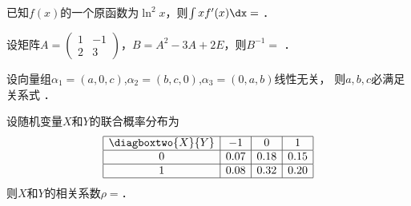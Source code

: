 \documentclass[plain,noanswer,medmath]{../../template/jnuexam}
\begin{document}








\begin{problem}
已知$f(x)$的一个原函数为$\ln^2 x$，则$\int xf'(x)\dx =$ \fillin{}．
\end{problem}


\begin{problem}
设矩阵$A = \begin{pmatrix}
  1 & -1 \\
  2 & 3
\end{pmatrix}$，$B = A^2 - 3A + 2E$，则$B^{-1} =$ \fillin{}．
\end{problem}


\begin{problem}
设向量组$\alpha_1 = (a,0,c)$,$\alpha_2 = (b,c,0)$,$\alpha_3 = (0,a,b)$线性无关，
则$a,b,c$必满足关系式 \fillin{}．
\end{problem}

\begin{problem}
设随机变量$X$和$Y$的联合概率分布为
$$\begin{array}{|c|c|c|c|}
\hline
  \diagboxtwo{X}{Y} & -1 & 0 & 1 \\
\hline
  0 & 0.07 & 0.18 & 0.15 \\
\hline
  1 & 0.08 & 0.32 & 0.20 \\
\hline
\end{array}$$
则$X$和$Y$的相关系数$\rho=$．
\end{problem}






\end{document}
